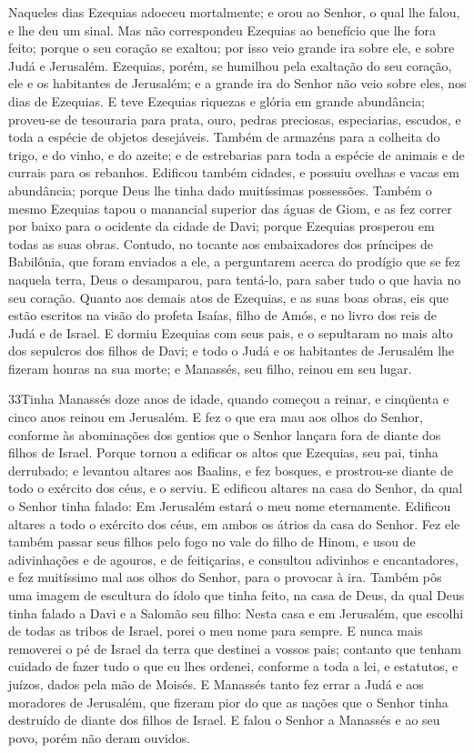 Naqueles dias Ezequias adoeceu mortalmente; e orou ao Senhor, o
qual lhe falou, e lhe deu um sinal. Mas não correspondeu
Ezequias ao benefício que lhe fora feito; porque o seu coração se
exaltou; por isso veio grande ira sobre ele, e sobre Judá e
Jerusalém. Ezequias, porém, se humilhou pela exaltação do seu
coração, ele e os habitantes de Jerusalém; e a grande ira do Senhor
não veio sobre eles, nos dias de Ezequias. E teve Ezequias
riquezas e glória em grande abundância; proveu-se de tesouraria para
prata, ouro, pedras preciosas, especiarias, escudos, e toda a
espécie de objetos desejáveis. Também de armazéns para a
colheita do trigo, e do vinho, e do azeite; e de estrebarias para
toda a espécie de animais e de currais para os rebanhos.
Edificou também cidades, e possuiu ovelhas e vacas em
abundância; porque Deus lhe tinha dado muitíssimas possessões.
Também o mesmo Ezequias tapou o manancial superior das águas
de Giom, e as fez correr por baixo para o ocidente da cidade de
Davi; porque Ezequias prosperou em todas as suas obras.
Contudo, no tocante aos embaixadores dos príncipes de
Babilônia, que foram enviados a ele, a perguntarem acerca do
prodígio que se fez naquela terra, Deus o desamparou, para tentá-lo,
para saber tudo o que havia no seu coração. Quanto aos demais
atos de Ezequias, e as suas boas obras, eis que estão escritos na
visão do profeta Isaías, filho de Amós, e no livro dos reis de Judá
e de Israel. E dormiu Ezequias com seus pais, e o sepultaram
no mais alto dos sepulcros dos filhos de Davi; e todo o Judá e os
habitantes de Jerusalém lhe fizeram honras na sua morte; e Manassés,
seu filho, reinou em seu lugar.

\medskip

\lettrine{33} Tinha Manassés doze anos de idade, quando
começou a reinar, e cinqüenta e cinco anos reinou em Jerusalém.
E fez o que era mau aos olhos do Senhor, conforme às abominações
dos gentios que o Senhor lançara fora de diante dos filhos de
Israel. Porque tornou a edificar os altos que Ezequias, seu pai,
tinha derrubado; e levantou altares aos Baalins, e fez bosques, e
prostrou-se diante de todo o exército dos céus, e o serviu. E
edificou altares na casa do Senhor, da qual o Senhor tinha falado:
Em Jerusalém estará o meu nome eternamente. Edificou altares a
todo o exército dos céus, em ambos os átrios da casa do Senhor.
Fez ele também passar seus filhos pelo fogo no vale do filho de
Hinom, e usou de adivinhações e de agouros, e de feitiçarias, e
consultou adivinhos e encantadores, e fez muitíssimo mal aos olhos
do Senhor, para o provocar à ira. Também pôs uma imagem de
escultura do ídolo que tinha feito, na casa de Deus, da qual Deus
tinha falado a Davi e a Salomão seu filho: Nesta casa e em
Jerusalém, que escolhi de todas as tribos de Israel, porei o meu
nome para sempre. E nunca mais removerei o pé de Israel da terra
que destinei a vossos pais; contanto que tenham cuidado de fazer
tudo o que eu lhes ordenei, conforme a toda a lei, e estatutos, e
juízos, dados pela mão de Moisés. E Manassés tanto fez errar a
Judá e aos moradores de Jerusalém, que fizeram pior do que as nações
que o Senhor tinha destruído de diante dos filhos de Israel.
E falou o Senhor a Manassés e ao seu povo, porém não deram
ouvidos.

